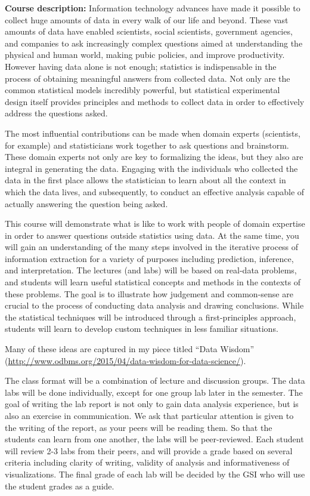 \documentclass[11pt]{article}
\begin{document}
\noindent 
{\bf Course description:}
Information technology advances have made it possible to collect 
huge amounts of data in every walk of our life and beyond. 
These vast amounts of data have enabled scientists, social
scientists, government agencies, and companies to ask increasingly complex questions 
aimed at understanding the physical and human world,
making pubic policies, and improve productivity.
However having data alone is not enough; statistics is indispensable in the process of obtaining
meaningful answers from collected data. Not only are the common statistical models incredibly 
powerful, but statistical experimental 
design itself provides principles and methods
to collect data in order to effectively address the questions asked.

The most influential contributions can be made when domain experts (scientists, for example) and
statisticians work together to ask questions and brainstorm. These domain experts not only are key to
formalizing the ideas, but they also are integral in generating the data. Engaging with the individuals 
who collected the data in the first place allows the statistician to learn about all the 
context in which the data lives, and subsequently, to conduct an effective analysis capable of actually 
answering the question being asked.

This course will demonstrate what is like to work with people
of domain expertise in order to answer questions outside statistics using data. 
At the same time, you will gain an understanding of the many steps involved
in the iterative process of information extraction for a variety of purposes including 
prediction, inference, and interpretation.
The lectures (and labs) will be based on real-data problems, and students will learn 
useful statistical concepts and methods in the contexts of these problems. 
The goal is to illustrate how judgement and common-sense
are crucial to the process of conducting data analysis and drawing conclusions. 
While the statistical techniques will be introduced through a first-principles approach, 
students will learn to develop custom techniques in less familiar situations.

Many of these ideas are captured in my piece titled ``Data Wisdom'' (\url{http://www.odbms.org/2015/04/data-wisdom-for-data-science/}).

The class format will be a combination of lecture and discussion groups.
The data labs will be done individually, except for one group lab later in the semester. 
The goal of writing the lab report is not only to gain data analysis experience, but is also 
an exercise in communication. We ask that particular attention
is given to the writing of the report, as your peers will be reading them.
So that the students can learn from one another, the labs will be peer-reviewed. 
Each student will review 2-3 labs from their peers, and will provide a grade based on several criteria
including clarity of writing, validity of analysis and informativeness of visualizations. 
The final grade of each lab will be decided by the GSI who will use the student grades as a guide.
\end{document}
